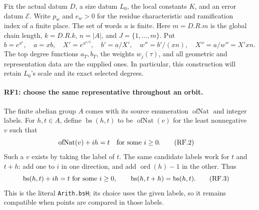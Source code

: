 \documentclass[11pt,a4paper]{article}
\numberwithin{equation}{section}
\theoremstyle{remark}\newtheorem{remark}[theorem]{Remark}
\begin{document}
Fix the actual datum $D$, a size datum $L_0$, the local constants $K$,
and an error datum $\mathcal E$. Write $p_w$ and $e_w>0$ for the residue
characteristic and ramification index of a finite place. The set of words
$u$ is finite. Here $m=D.R.m$ is the global chain length, $k=D.R.k$,
$n=|A|$, and $J=\{1,\ldots,m\}$. Put
\[
 b=e^{x^\epsilon},\quad a=xb,\quad X'=e^{x^{\epsilon/3}},\quad
 b'=a/X',\quad w''=b'/(xn),\quad X''=a/w''=X'xn.       \tag{RF.1}
\]
The top degree functions $a_T,b_T$, the weights $w_j(\tau)$, and all
geometric and representation data are the supplied ones. In particular,
this construction will retain $L_0$'s scale and its exact selected degrees.

\paragraph{RF1: choose the same representative throughout an orbit.}
The finite abelian group $A$ comes with its source enumeration
$\operatorname{ofNat}$ and integer labels. For $h,t\in A$, define
$\operatorname{bs}(h,t)$ to be $\operatorname{ofNat}(v)$ for the least
nonnegative $v$ such that
\[
                  \operatorname{ofNat}(v)+ih=t
                  \quad\hbox{for some }i\geq0.                 \tag{RF.2}
\]
Such a $v$ exists by taking the label of $t$. The same candidate labels
work for $t$ and $t+h$: add one to $i$ in one direction, and add
$\operatorname{ord}(h)-1$ in the other. Thus
\[
 \operatorname{bs}(h,t)+ih=t\ \hbox{for some }i\geq0,
 \qquad\operatorname{bs}(h,t+h)=\operatorname{bs}(h,t).          \tag{RF.3}
\]
This is the literal \texttt{Arith.bsH}; its choice uses the given labels,
so it remains compatible when points are compared in those labels.
\end{document}
